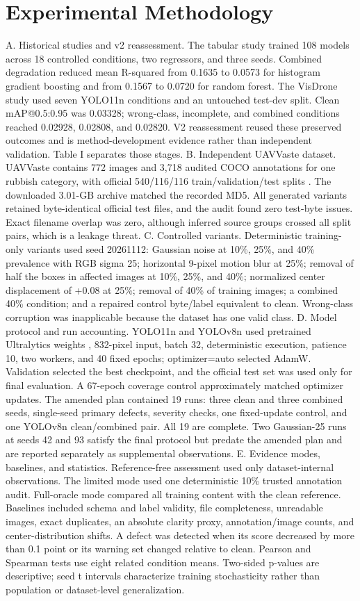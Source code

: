 \documentclass[conference]{IEEEtran}
\begin{document}
\section{Experimental Methodology}
A. Historical studies and v2 reassessment. The tabular study trained 108 models across 18 controlled conditions, two regressors, and three seeds. Combined degradation reduced mean R-squared from 0.1635 to 0.0573 for histogram gradient boosting and from 0.1567 to 0.0720 for random forest. The VisDrone study used seven YOLO11n conditions and an untouched test-dev split. Clean mAP@0.5:0.95 was 0.03328; wrong-class, incomplete, and combined conditions reached 0.02928, 0.02808, and 0.02820. V2 reassessment reused these preserved outcomes and is method-development evidence rather than independent validation. Table I separates those stages.
B. Independent UAVVaste dataset. UAVVaste contains 772 images and 3,718 audited COCO annotations for one rubbish category, with official 540/116/116 train/validation/test splits \cite{r7,r8}. The downloaded 3.01-GB archive matched the recorded MD5. All generated variants retained byte-identical official test files, and the audit found zero test-byte issues. Exact filename overlap was zero, although inferred source groups crossed all split pairs, which is a leakage threat.
C. Controlled variants. Deterministic training-only variants used seed 20261112: Gaussian noise at 10\%, 25\%, and 40\% prevalence with RGB sigma 25; horizontal 9-pixel motion blur at 25\%; removal of half the boxes in affected images at 10\%, 25\%, and 40\%; normalized center displacement of +0.08 at 25\%; removal of 40\% of training images; a combined 40\% condition; and a repaired control byte/label equivalent to clean. Wrong-class corruption was inapplicable because the dataset has one valid class.
D. Model protocol and run accounting. YOLO11n and YOLOv8n used pretrained Ultralytics weights \cite{r9}, 832-pixel input, batch 32, deterministic execution, patience 10, two workers, and 40 fixed epochs; optimizer=auto selected AdamW. Validation selected the best checkpoint, and the official test set was used only for final evaluation. A 67-epoch coverage control approximately matched optimizer updates. The amended plan contained 19 runs: three clean and three combined seeds, single-seed primary defects, severity checks, one fixed-update control, and one YOLOv8n clean/combined pair. All 19 are complete. Two Gaussian-25 runs at seeds 42 and 93 satisfy the final protocol but predate the amended plan and are reported separately as supplemental observations.
E. Evidence modes, baselines, and statistics. Reference-free assessment used only dataset-internal observations. The limited mode used one deterministic 10\% trusted annotation audit. Full-oracle mode compared all training content with the clean reference. Baselines included schema and label validity, file completeness, unreadable images, exact duplicates, an absolute clarity proxy, annotation/image counts, and center-distribution shifts. A defect was detected when its score decreased by more than 0.1 point or its warning set changed relative to clean. Pearson and Spearman tests use eight related condition means. Two-sided p-values are descriptive; seed t intervals characterize training stochasticity rather than population or dataset-level generalization.
\end{document}

